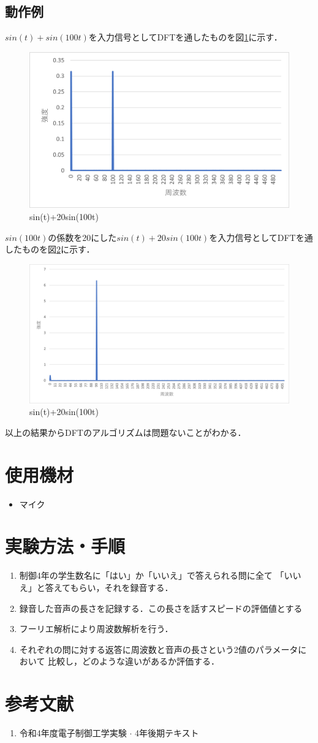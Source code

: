 \documentclass[titlepage]{jarticle}
\begin{document}
\subsection{動作例}
$sin(t)+sin(100t)$を入力信号としてDFTを通したものを図\ref{1_100}に示す．
\begin{figure}[H]
  \centering
  \includegraphics[width=0.6\hsize]{img/1_100.png}
  \caption{sin(t)+20sin(100t)}
  \label{1_100}
\end{figure}

$sin(100t)$の係数を20にした$sin(t)+20sin(100t)$を入力信号としてDFTを通したものを図\ref{1_20-100}に示す．
\begin{figure}[H]
  \centering
  \includegraphics[width=0.6\hsize]{img/1_20-100.png}
  \caption{sin(t)+20sin(100t)}
  \label{1_20-100}
\end{figure}
以上の結果からDFTのアルゴリズムは問題ないことがわかる．

\section{使用機材}
\begin{itemize}
  \item マイク
\end{itemize}

\section{実験方法・手順}
\begin{enumerate}
  \item 制御4年の学生数名に「はい」か「いいえ」で答えられる問に全て
        「いいえ」と答えてもらい，それを録音する．
  \item 録音した音声の長さを記録する．この長さを話すスピードの評価値とする
  \item フーリエ解析により周波数解析を行う．
  \item それぞれの問に対する返答に周波数と音声の長さという2値のパラメータにおいて
        比較し，どのような違いがあるか評価する．
\end{enumerate}

\section*{参考文献}
\begin{enumerate}
  \item 令和4年度電子制御工学実験 $\cdot$ 4年後期テキスト
\end{enumerate}
\end{document}

